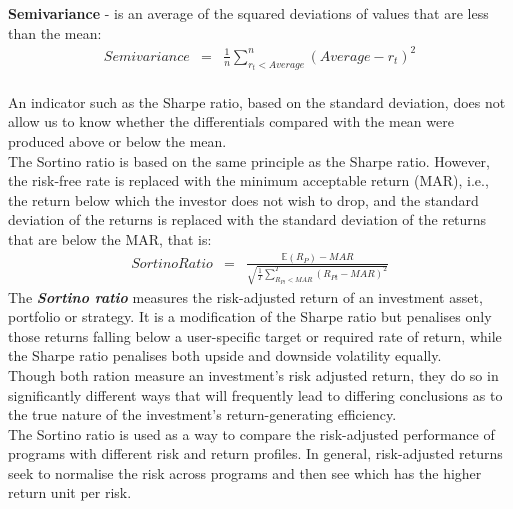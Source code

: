 \textbf{Semivariance} - is an average of the squared deviations of values that are less than the mean:
\begin{eqnarray}
Semivariance &=& \frac{1}{n}\sum_{r_{t} < Average}^{n}\left(Average - r_{t}\right)^{2}
\end{eqnarray}\\
An indicator such as the Sharpe ratio, based on the standard deviation, does not allow us to know whether the differentials compared with the mean were produced above or below the mean.\\
The Sortino ratio is based on the same principle as the Sharpe ratio. However, the risk-free rate is replaced with the minimum acceptable return (MAR), i.e., the return below which the investor does not wish to drop, and the standard deviation of the returns is replaced with the standard deviation of the returns that are below the MAR, that is:
\begin{eqnarray}
Sortino Ratio &=& \frac{\mathbb{E}(R_{P}) - MAR}{\sqrt{\frac{1}{T}\sum_{R_{Pt} < MAR}^{T}\left(R_{Pt} - MAR\right)^{2}}}
\end{eqnarray}
The \textit{\textbf{\color{blue}Sortino ratio}} measures the risk-adjusted return of an investment asset, portfolio or strategy. It is a modification of the Sharpe ratio but penalises only those returns falling below a user-specific target or required rate of return, while the Sharpe ratio penalises both upside and downside volatility equally.\\
Though both ration measure an investment's risk adjusted return, they do so in significantly different ways that will frequently lead to differing conclusions as to the true nature of the investment's return-generating efficiency.\\
The Sortino ratio is used as a way to compare the risk-adjusted performance of programs with different risk and return profiles. In general, risk-adjusted returns seek to normalise the risk across programs and then see which has the higher return unit per risk.\\
